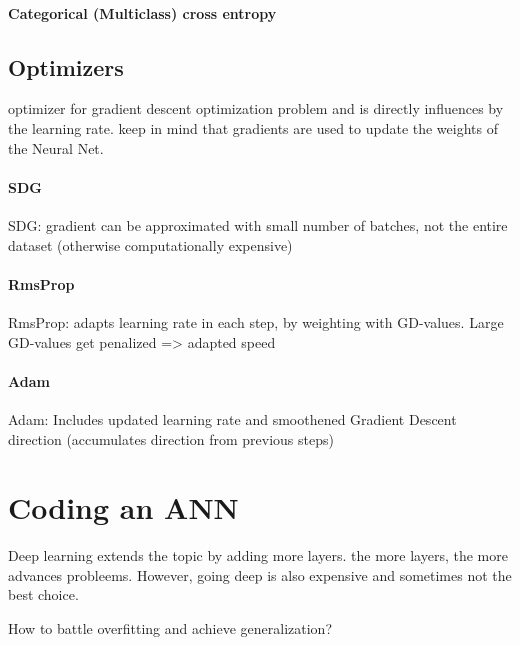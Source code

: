 \paragraph{Categorical (Multiclass) cross entropy}
%
%
\subsection{Optimizers}	
%
%
optimizer for gradient descent optimization problem and is directly influences by the learning rate. keep in mind that gradients are used to update the weights of the Neural Net.

\paragraph{SDG}

SDG: gradient can be approximated with small number of batches, not the entire dataset (otherwise computationally expensive) 

\paragraph{RmsProp}

RmsProp: adapts learning rate in each step, by weighting with GD-values. Large GD-values get penalized => adapted speed

\paragraph{Adam}

Adam: Includes updated learning rate and smoothened Gradient Descent direction (accumulates direction from previous steps) 


%
%
\section{Coding an ANN}	
%
%

Deep learning extends the topic by adding more layers. the more layers, the more advances probleems. However, going deep is also expensive and sometimes not the best choice.

How to battle overfitting and achieve generalization?

